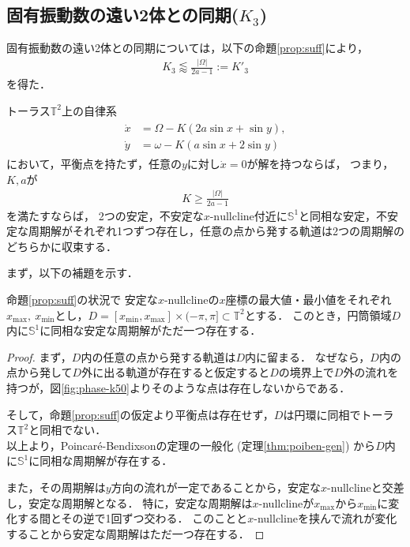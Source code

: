\documentclass[../main]{subfiles}
\begin{document}
    \subsection{固有振動数の遠い2体との同期($K_3$)}
    \label{sec:3body-k3}
    固有振動数の遠い2体との同期については，以下の命題\ref{prop:suff}により，
    \begin{align}
        \label{eq;:K2-approx}
        K_3\lessapprox \frac{|\Omega|}{2a-1}:=K'_3
    \end{align}
    を得た．
    \begin{proposition}
        \label{prop:suff}
        トーラス$\mathbb{T}^2$上の自律系
        \begin{align}
            \label{eq:prop-2phase}
            \begin{split}
                \dot{x}&=\Omega-K(2a\sin x+\sin y),\\
                \dot{y}&=\omega-K(a\sin x+2\sin y)
            \end{split}
        \end{align}
        において，平衡点を持たず，任意の$y$に対し$\dot{x}=0$が解を持つならば，
        つまり，$K,a$が
        \begin{align*}
            K\geq \frac{|\Omega|}{2a-1}
        \end{align*}
        を満たすならば，
        2つの安定，不安定な$x$-$\mathrm{nullcline}$付近に$\mathbb{S}^1$と同相な安定，不安定な周期解がそれぞれ1つずつ存在し，任意の点から発する軌道は2つの周期解のどちらかに収束する．
    \end{proposition}
    まず，以下の補題を示す．
    \begin{lemma}
        \label{lemma:annulus}
        命題\ref{prop:suff}の状況で
        安定な$x$-nullclineの$x$座標の最大値・最小値をそれぞれ$x_{\max},\ x_{\min}$とし，$D=[x_{\min},x_{\max}]\times (-\pi,\pi ]\subset\mathbb{T}^2$とする．
        このとき，円筒領域$D$内に$\mathbb{S}^1$に同相な安定な周期解がただ一つ存在する．        
    \end{lemma}
    \begin{proof}
        まず，$D$内の任意の点から発する軌道は$D$内に留まる．
        なぜなら，$D$内の点から発して$D$外に出る軌道が存在すると仮定すると$D$の境界上で$D$外の流れを持つが，図\ref{fig:phase-k50}よりそのような点は存在しないからである．

        そして，命題\ref{prop:suff}の仮定より平衡点は存在せず，$D$は円環に同相でトーラス$\mathbb{T}^2$と同相でない．\\
        以上より，Poincar\'{e}-Bendixsonの定理の一般化 (定理\ref{thm:poiben-gen}) から$D$内に$\mathbb{S}^1$に同相な周期解が存在する．
        
        また，その周期解は$y$方向の流れが一定であることから，安定な$x$-nullclineと交差し，安定な周期解となる．
        特に，安定な周期解は$x$-nullclineが$x_{\max}$から$x_{\min}$に変化する間とその逆で1回ずつ交わる．
        このことと$x$-nullclineを挟んで流れが変化することから安定な周期解はただ一つ存在する．    
    \end{proof}
\end{document}
